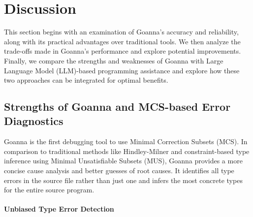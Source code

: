 \documentclass[pdflatex,sn-mathphys-num]{sn-jnl}%
\begin{document}
  
        


\section{Discussion} \label{sec:discussion}

This section begins with an examination of Goanna's accuracy and reliability, along with its practical advantages over traditional tools. We then analyze the trade-offs made in Goanna's performance and explore potential improvements. Finally, we compare the strengths and weaknesses of Goanna with Large Language Model (LLM)-based programming assistance and explore how these two approaches can be integrated for optimal benefits.

\subsection{Strengths of Goanna and MCS-based Error Diagnostics}

Goanna is the first debugging tool to use Minimal Correction Subsets (MCS). In comparison to traditional methods like Hindley-Milner and constraint-based type inference using Minimal Unsatisfiable Subsets (MUS), Goanna provides a more concise cause analysis and better guesses of root causes. It identifies all type errors in the source file rather than just one and infers the most concrete types for the entire source program.

\paragraph{Unbiased Type Error Detection}
\end{document}
